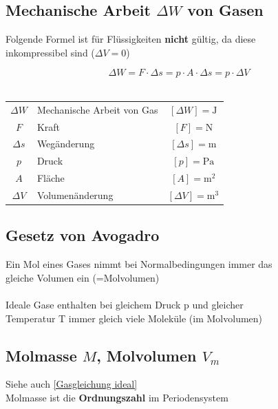 

\subsection{Mechanische Arbeit $\Delta W$ von Gasen}
\label{MechArbeit}

Folgende Formel ist für Flüssigkeiten \textbf{nicht} gültig, da diese \\
inkompressibel sind ($\Delta V = 0$)


$$ \boxed{ \Delta W = F \cdot \Delta s = p \cdot A \cdot \Delta s = p \cdot \Delta V } $$
\\

\begin{tabular}{c l c}
	$\Delta W$ & Mechanische Arbeit von Gas & $[\Delta W] = \mathrm{J}$ \\
	$F$ & Kraft & $[F] = \mathrm{N}$ \\
	$\Delta s$ & Wegänderung & $[\Delta s] = \mathrm{m}$ \\
	$p$ & Druck & $[p] = \mathrm{Pa}$ \\
	$A$ & Fläche & $[A] = \mathrm{m^2}$ \\
	$\Delta V$ & Volumenänderung & $[\Delta V] = \mathrm{m^3}$ \\
\end{tabular}



\subsection{Gesetz von Avogadro}
Ein Mol eines Gases nimmt bei Normalbedingungen immer das \\
gleiche Volumen ein (=Molvolumen) \\
\\
Ideale Gase enthalten bei gleichem Druck p und gleicher \\
Temperatur T immer gleich viele Moleküle (im Molvolumen)





\subsection{Molmasse $M$, Molvolumen $V_m$}

Siehe auch \ref{Gasgleichung ideal}\\

Molmasse ist die \textbf{Ordnungszahl} im Periodensystem

